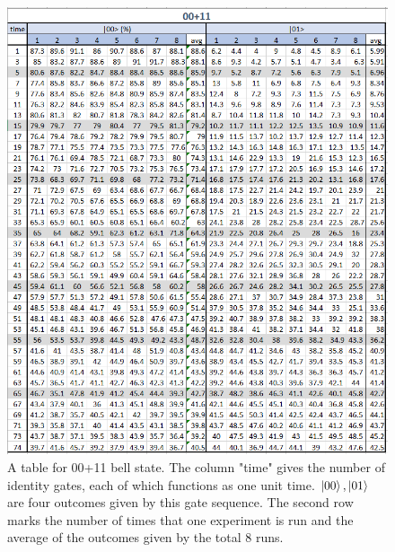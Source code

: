 \documentclass[letterpaper]{article}
\numberwithin{equation}{section} %
\numberwithin{figure}{section} %
\numberwithin{table}{section} %
\begin{document}
\begin{figure}[h]
	\includegraphics[width=\textwidth]{t00n11}
	\caption{A table for 00+11 bell state. The column "time" gives the number of identity gates, each of which functions as one unit time. $\ket{00}, \ket{01}$ are four outcomes given by this gate sequence. The second row marks the number of times that one experiment is run and the average of the outcomes given by the total 8 runs.}
	\label{t00n11}
\end{figure}
\end{document}
